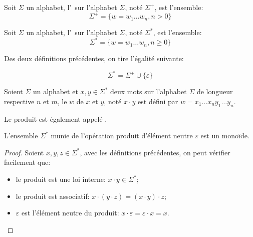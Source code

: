 
\begin{definition}
    Soit \( \Sigma \) un alphabet, l'\ sur l'alphabet \( \Sigma \), noté \( \Sigma^+ \), est l'ensemble:
    \begin{equation}
        \Sigma^+ = \{ w = w_1 \ldots w_n, n > 0 \}
    \end{equation}
\end{definition}

\begin{definition}
    Soit \( \Sigma \) un alphabet, l'\ sur l'alphabet \( \Sigma \), noté \( \Sigma^* \), est l'ensemble:
    \begin{equation}
        \Sigma^* = \{ w = w_1 \ldots w_n, n \geq 0 \}
    \end{equation}
\end{definition}

Des deux définitions précédentes, on tire l'égalité suivante:

\begin{equation}
  \Sigma^* = \Sigma^+ \cup \{ \varepsilon \}
\end{equation}

\begin{definition}
    Soient \( \Sigma \) un alphabet et \( x, y \in \Sigma^* \) deux mots sur l'alphabet \( \Sigma \) de longueur respective \( n \) et \( m \), le  \( w \) de \( x \) et \( y \), noté \( x \cdot y \) est défini par \( w = x_1 \ldots x_n y_1 \ldots y_n \).
\end{definition}

Le produit est également appelé .

\begin{proposition}
    L'ensemble \( \Sigma^* \) munie de l'opération produit d'élément neutre \( \varepsilon \) est un monoïde.
\end{proposition}

\begin{proof}
    Soient \( x, y, z \in \Sigma^* \), avec les définitions précédentes, on peut vérifier facilement que:
    \begin{itemize}
    \item
      le produit est une loi interne: $x \cdot y \in \Sigma^*$;
    \item
      le produit est associatif: $x \cdot (y \cdot z) = (x \cdot y) \cdot z$;
    \item
      $\varepsilon$ est l'élément neutre du produit: $x \cdot \varepsilon = \varepsilon \cdot x = x$.
    \end{itemize}
\end{proof}

